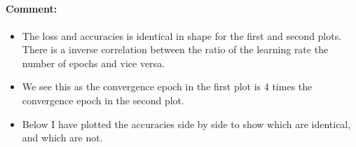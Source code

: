 \documentclass[a4paper,landscape]{article}
\providecommand{\tightlist}{%
      \setlength{\itemsep}{0pt}\setlength{\parskip}{0pt}}
\begin{document}
    \begin{center}
    \end{center}
    { \hspace*{\fill} \\}
    
    \begin{center}
    \end{center}
    { \hspace*{\fill} \\}
    
    \begin{center}
    \end{center}
    { \hspace*{\fill} \\}
    
    \paragraph{Comment:}\label{comment}

\begin{itemize}
\tightlist
\item
  The loss and accuracies is identical in shape for the first and second
  plots. There is a inverse correlation between the ratio of the
  learning rate the number of epochs and vice versa.
\item
  We see this as the convergence epoch in the first plot is 4 times the
  convergence epoch in the second plot.
\item
  Below I have plotted the accuracies side by side to show which are
  identical, and which are not.
\end{itemize}
\end{document}
